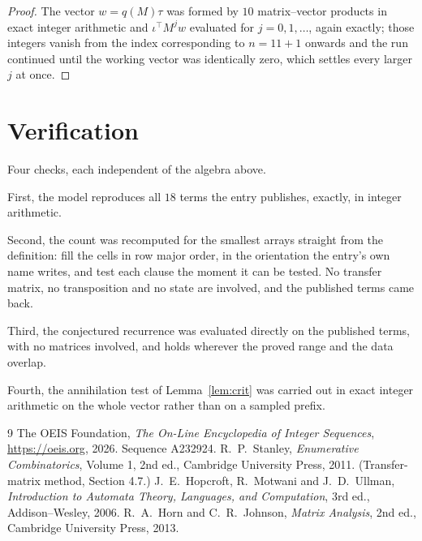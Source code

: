 \documentclass[11pt,a4paper]{article}
\theoremstyle{plain}
\theoremstyle{definition}
\begin{document}
\begin{proof}
The vector $w=q(M)\tau$ was formed by $10$ matrix--vector products in exact integer
arithmetic and $\iota^{\!\top}M^{j}w$ evaluated for $j=0,1,\dots$, again exactly; those
integers vanish from the index corresponding to $n=11+1$ onwards and the run continued
until the working vector was identically zero, which settles every larger $j$ at once.
\end{proof}

\section{Verification}

Four checks, each independent of the algebra above.

First, the model reproduces all $18$ terms the entry publishes, exactly, in integer
arithmetic.

Second, the count was recomputed for the smallest arrays straight from the definition: fill the
cells in row major order, in the orientation the entry's own name writes, and test each clause
the moment it can be tested. No transfer matrix, no transposition and no state are involved,
and the published terms came back.

Third, the conjectured recurrence was evaluated directly on the published terms, with no
matrices involved, and holds wherever the proved range and the data overlap.

Fourth, the annihilation test of Lemma~\ref{lem:crit} was carried out in exact integer
arithmetic on the whole vector rather than on a sampled prefix.

\begin{thebibliography}{9}
 The OEIS Foundation, \emph{The On-Line Encyclopedia of Integer
Sequences}, \url{https://oeis.org}, 2026. Sequence A232924.
 R.~P.~Stanley, \emph{Enumerative Combinatorics}, Volume 1, 2nd ed.,
Cambridge University Press, 2011. (Transfer-matrix method, Section 4.7.)
 J.~E.~Hopcroft, R.~Motwani and J.~D.~Ullman, \emph{Introduction to Automata
Theory, Languages, and Computation}, 3rd ed., Addison--Wesley, 2006.
 R.~A.~Horn and C.~R.~Johnson, \emph{Matrix Analysis}, 2nd ed., Cambridge
University Press, 2013.
\end{thebibliography}
\end{document}
